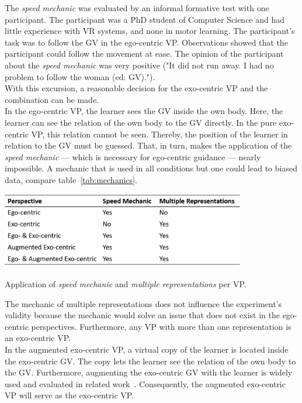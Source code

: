 The \textit{speed mechanic} was evaluated by an informal formative test with one participant. The participant was a PhD student of Computer Science and had little experience with VR systems, and none in motor learning. The participant's task was to follow the GV in the ego-centric VP. Observations showed that the participant could follow the movement at ease. The opinion of the participant about the \textit{speed mechanic} was very positive ("It did not run away. I had no problem to follow the woman (ed: GV).").\\
With this excursion, a reasonable decision for the exo-centric VP and the combination can be made.\\

In the ego-centric VP, the learner sees the GV inside the own body. Here, the learner can see the relation of the own body to the GV directly. In the pure exo-centric VP, this relation cannot be seen. Thereby, the position of the learner in relation to the GV must be guessed. That, in turn, makes the application of the \textit{speed mechanic} --- which is necessary for ego-centric guidance --- nearly impossible. A mechanic that is used in all conditions but one could lead to biased data, compare table~\ref{tab:mechanics}.
\begin{table}[htb]
	\centering
	\includegraphics[width=0.8\textwidth]{figures/mechanics_comparison.png}
	\caption[Application of mechanics per visual perspective]{Application of \textit{speed mechanic} and \textit{multiple representations} per VP.}
	\label{tab:mechanics}
\end{table}
The mechanic of multiple representations does not influence the experiment's validity because the mechanic would solve an issue that does not exist in the ego-centric perspectives. Furthermore, any VP with more than one representation is an exo-centric VP.\\
In the augmented exo-centric VP, a virtual copy of the learner is located inside the exo-centric GV. The copy lets the learner see the relation of the own body to the GV. Furthermore, augmenting the exo-centric GV with the learner is widely used and evaluated in related work~\cite{YouMove,thaichichua}. Consequently, the augmented exo-centric VP will serve as the exo-centric VP.\\
